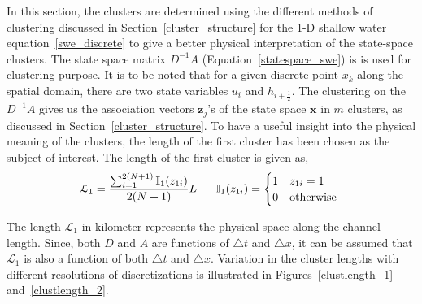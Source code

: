 In this section, the clusters are determined using the different methods of clustering discussed in Section~\ref{cluster_structure} for the 1-D shallow water equation~\ref{swe_discrete} to give a better physical interpretation of the state-space clusters. The state space matrix $D^{-1} A$ (Equation~\ref{statespace_swe}) is is used for clustering purpose. It is to be noted that for a given discrete point $x_k$ along the spatial domain, there are two state variables $u_i$ and $h_{i+\frac{1}{2}}$. The clustering on the $D^{-1} A$ gives us the association vectors $\textbf{z}_j$'s of the state space $\textbf{x}$ in $m$ clusters, as discussed in Section~\ref{cluster_structure}. To have a useful insight into the physical meaning of the clusters, the length of the first cluster has been chosen as the subject of interest. The length of the first cluster is given as,
\begin{equation}
\mathcal{L}_1 = \displaystyle \frac{\sum_{i=1}^{2(N+1)} \mathbb{I}_1(z_{1i}) }{2(N+1)} L \hspace{6mm} \mathbb{I}_1(z_{1i}) = \begin{cases}
1 & z_{1i} = 1 \\ 0 & \text{otherwise }
\end{cases}
\end{equation} 

The length $\mathcal{L}_1$ in kilometer represents the physical space along the channel length. Since, both $D$ and $A$ are functions of $\bigtriangleup t$ and $\bigtriangleup x$, it can be assumed that $\mathcal{L}_1$ is also a function of both $\bigtriangleup t$ and $\bigtriangleup x$.  Variation in the cluster lengths with different resolutions of discretizations is illustrated in Figures~\ref{clustlength_1} and~\ref{clustlength_2}.

